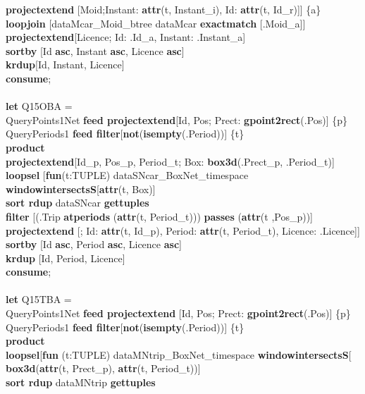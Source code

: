 \documentclass[a4paper]{article}
\newcommand{\op}[1]{\textbf{#1}}
\begin{document}
\begin{scriptsize}
\begin{tabbing}
\>\>\op{projectextend} [Moid;Instant: \op{attr}(t, Instant\_i), Id: \op{attr}(t, Id\_r)]] \{a\}\\
\>\op{loopjoin} [dataMcar\_Moid\_btree dataMcar \op{exactmatch} [.Moid\_a]]\\
\>\op{projectextend}[Licence; Id: .Id\_a, Instant: .Instant\_a]\\
\>\op{sortby} [Id \op{asc}, Instant \op{asc}, Licence \op{asc}]\\
\>\op{krdup}[Id, Instant, Licence]\\
\op{consume};\\
\\
\op{let} Q15OBA =\\
\>QueryPoints1Net \op{feed projectextend}[Id, Pos; Prect: \op{gpoint2rect}(.Pos)] \{p\}\\
\>QueryPeriods1 \op{feed filter}[\op{not}(\op{isempty}(.Period))] \{t\}\\
\>\op{product}\\
\>\op{projectextend}[Id\_p, Pos\_p, Period\_t; Box: \op{box3d}(.Prect\_p, .Period\_t)]\\
\>\op{loopsel} [\op{fun}(t:TUPLE) dataSNcar\_BoxNet\_timespace \op{windowintersectsS}[\op{attr}(t, Box)]\\
\>\>\op{sort rdup} dataSNcar \op{gettuples}\\
\>\>\op{filter} [(.Trip \op{atperiods} (\op{attr}(t, Period\_t))) \op{passes} (\op{attr}(t ,Pos\_p))]\\
\>\>\op{projectextend} [; Id: \op{attr}(t, Id\_p), Period: \op{attr}(t, Period\_t), Licence: .Licence]]\\
\>\op{sortby} [Id \op{asc}, Period \op{asc}, Licence \op{asc}]\\
\>\op{krdup} [Id, Period, Licence]\\
\op{consume};\\
\\
\op{let} Q15TBA =\\
\>QueryPoints1Net \op{feed projectextend} [Id, Pos; Prect: \op{gpoint2rect}(.Pos)] \{p\}\\
\>QueryPeriods1 \op{feed filter}[\op{not}(\op{isempty}(.Period))] \{t\}\\
\>\op{product}\\
\>\op{loopsel}[\op{fun} (t:TUPLE) dataMNtrip\_BoxNet\_timespace \op{windowintersectsS}[\\
\>\>\>\op{box3d}(\op{attr}(t, Prect\_p), \op{attr}(t, Period\_t))]\\
\>\>\op{sort rdup} dataMNtrip \op{gettuples}\\

\end{tabbing}
\end{scriptsize}
\end{document}
